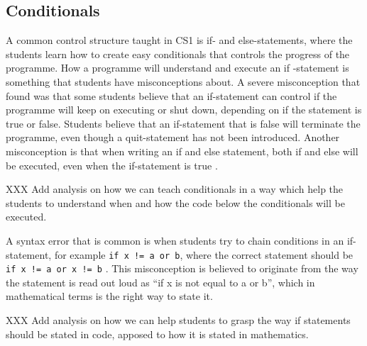 \mode*
\subsection{Conditionals}

A common control structure taught in CS1 is if- and else-statements, where 
the students learn how to create easy conditionals that controls the 
progress of the programme. How a programme will understand and execute an if
-statement is something that students have misconceptions about. A severe 
misconception that \textcite{Plass2015Variables} found was that some 
students believe that an if-statement can control if the programme will 
keep on executing or shut down, depending on if the statement is true or 
false. Students believe that an if-statement that is false will terminate 
the programme, even though a quit-statement has not been introduced. 
Another misconception is that when writing an if and else statement, both 
if and else will be executed, even when the if-statement is true \parencite{
MisconceptionsSurvey2017}.

XXX Add analysis on how we can teach conditionals in a way which help the 
students to understand when and how the code below the conditionals will be 
executed.

A syntax error that is common is when students try to chain conditions in 
an if-statement, for example \texttt{if x != a or b}, where the 
correct statement should be \texttt{if x != a or x != b} 
\parencite{GuoMarkelZhang2020}. This misconception is believed to originate 
from the way the statement is read out loud as \enquote{if x is not equal to a 
or b}, which in mathematical terms is the right way to state it. 

XXX Add analysis on how we can help students to grasp the way if statements 
should be stated in code, apposed to how it is stated in mathematics. 
